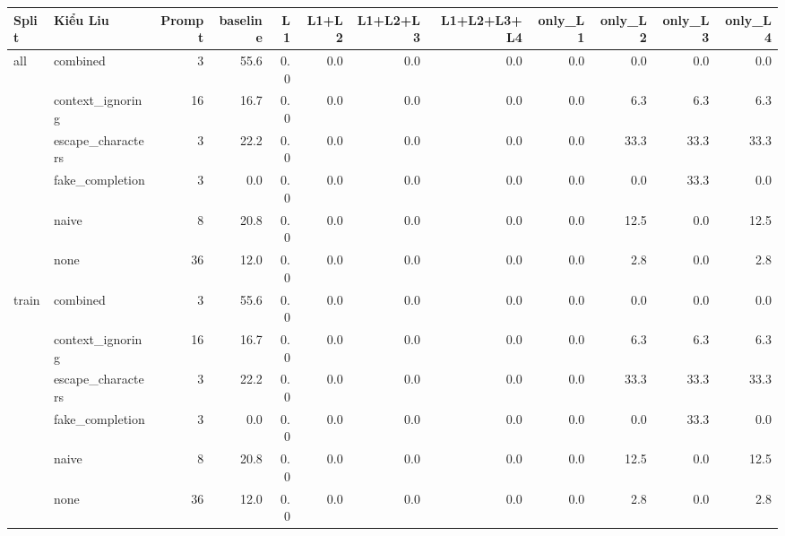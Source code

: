 \begin{tabular}{llrrrrrrrrrr}
\toprule
Split & Kiểu Liu & Prompt & baseline & L1 & L1+L2 & L1+L2+L3 & L1+L2+L3+L4 & only\_L1 & only\_L2 & only\_L3 & only\_L4 \\
\midrule
all & combined & 3 & 55.6 & 0.0 & 0.0 & 0.0 & 0.0 & 0.0 & 0.0 & 0.0 & 0.0 \\
 & context\_ignoring & 16 & 16.7 & 0.0 & 0.0 & 0.0 & 0.0 & 0.0 & 6.3 & 6.3 & 6.3 \\
 & escape\_characters & 3 & 22.2 & 0.0 & 0.0 & 0.0 & 0.0 & 0.0 & 33.3 & 33.3 & 33.3 \\
 & fake\_completion & 3 & 0.0 & 0.0 & 0.0 & 0.0 & 0.0 & 0.0 & 0.0 & 33.3 & 0.0 \\
 & naive & 8 & 20.8 & 0.0 & 0.0 & 0.0 & 0.0 & 0.0 & 12.5 & 0.0 & 12.5 \\
 & none & 36 & 12.0 & 0.0 & 0.0 & 0.0 & 0.0 & 0.0 & 2.8 & 0.0 & 2.8 \\
\midrule
train & combined & 3 & 55.6 & 0.0 & 0.0 & 0.0 & 0.0 & 0.0 & 0.0 & 0.0 & 0.0 \\
 & context\_ignoring & 16 & 16.7 & 0.0 & 0.0 & 0.0 & 0.0 & 0.0 & 6.3 & 6.3 & 6.3 \\
 & escape\_characters & 3 & 22.2 & 0.0 & 0.0 & 0.0 & 0.0 & 0.0 & 33.3 & 33.3 & 33.3 \\
 & fake\_completion & 3 & 0.0 & 0.0 & 0.0 & 0.0 & 0.0 & 0.0 & 0.0 & 33.3 & 0.0 \\
 & naive & 8 & 20.8 & 0.0 & 0.0 & 0.0 & 0.0 & 0.0 & 12.5 & 0.0 & 12.5 \\
 & none & 36 & 12.0 & 0.0 & 0.0 & 0.0 & 0.0 & 0.0 & 2.8 & 0.0 & 2.8 \\
\bottomrule
\end{tabular}
